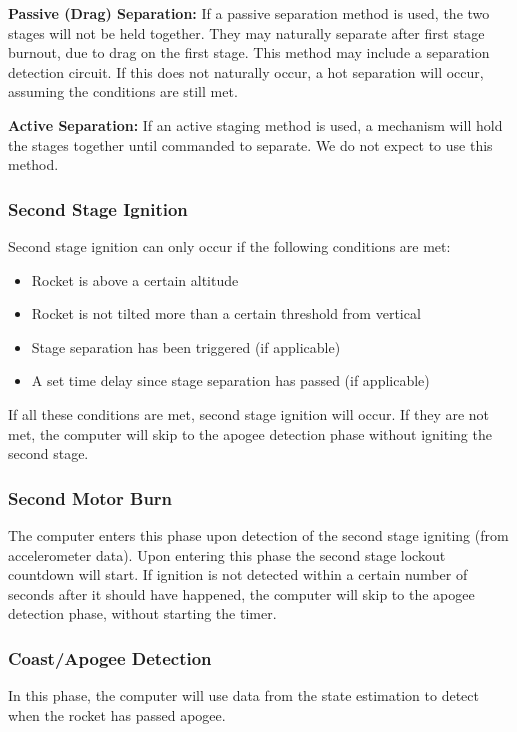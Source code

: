 \noindent\textbf{Passive (Drag) Separation:} If a passive separation method is used, the two stages will not be held together. They may naturally separate after first stage burnout, due to drag on the first stage. This method may include a separation detection circuit. If this does not naturally occur, a hot separation will occur, assuming the conditions are still met.

\noindent\textbf{Active Separation:} If an active staging method is used, a mechanism will hold the stages together until commanded to separate. We do not expect to use this method.

\subsubsection*{Second Stage Ignition}
Second stage ignition can only occur if the following conditions are met:

\begin{itemize}
    \item Rocket is above a certain altitude
    \item Rocket is not tilted more than a certain threshold from vertical
    \item Stage separation has been triggered (if applicable)
    \item A set time delay since stage separation has passed (if applicable)
\end{itemize}

If all these conditions are met, second stage ignition will occur. If they are not met, the computer will skip to the apogee detection phase without igniting the second stage. 

\subsubsection*{Second Motor Burn}
The computer enters this phase upon detection of the second stage igniting (from accelerometer data). Upon entering this phase the second stage lockout countdown will start. If ignition is not detected within a certain number of seconds after it should have happened, the computer will skip to the apogee detection phase, without starting the timer.

\subsubsection*{Coast/Apogee Detection}
In this phase, the computer will use data from the state estimation to detect when the rocket has passed apogee. 

